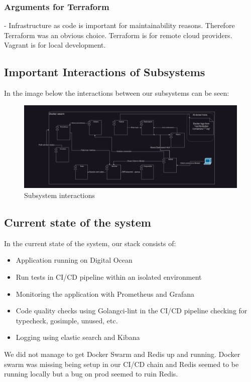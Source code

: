 \subsubsection{Arguments for Terraform}
- Infrastructure as code is important for maintainability reasons. Therefore Terraform was an obvious choice.
Terraform is for remote cloud providers. Vagrant is for local development. 

\subsection{Important Interactions of Subsystems}
In the image below the interactions between our subsystems can be seen:

\begin{figure}[H]
    \centering
    \captionsetup{justification=centering,margin=1cm}
    \includegraphics[width=0.8\linewidth]{report/images/InteractionsOfSystems.png}
    \caption{Subsystem interactions}
    \label{fig:minitwit}
\end{figure}

\subsection{Current state of the system}
In the current state of the system, our stack consists of: 
\begin{itemize}
    \item Application running on Digital Ocean
    \item Run tests in CI/CD pipeline within an isolated environment
    \item Monitoring the application with Prometheus and Grafana
    \item Code quality checks using Golangci-lint in the CI/CD pipeline checking for typecheck, gosimple, unused, etc.
    \item Logging using elastic search and Kibana
\end{itemize}
We did not manage to get Docker Swarm and Redis up and running. Docker swarm was missing being setup 
in our CI/CD chain and Redis seemed to be running locally but a bug on prod seemed to ruin Redis.

